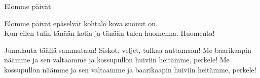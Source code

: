 \begin{song}{Elomme päivät}


	Elomme päivät epäselvät
	kohtalo kova suonut on. \\
    \repetitionbegin{} Kun eilen tulin tänään kotia
	ja tänään tulen huomenna. Huomenta!
	\repetitionend{}

	Jumalauta täällä sammutaan!
	Siskot, veljet, tulkaa auttamaan!
	Me baarikaapin näämme ja sen valtaamme
	ja kossupullon huiviin heitämme, perkele!
	Me kossupullon näämme ja sen valtaamme
	ja baarikaapin huiviin heitämme, perkele!
	
\end{song}
